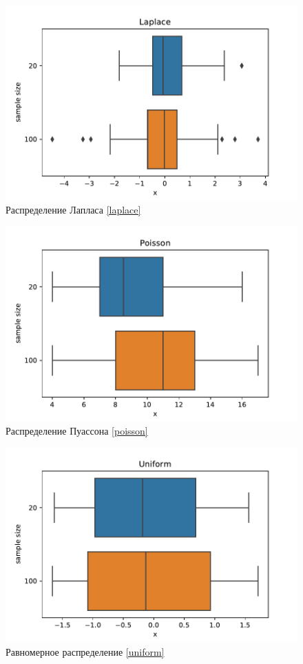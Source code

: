 \documentclass[a4paper]{article}
\begin{document}
\begin{figure}[H]
    \centering
    \includegraphics[width = 16 cm]{resources/LaplaceBox.pdf}
    \caption{Распределение Лапласа \eqref{laplace}}
    \label{fig:laplaceBox}
\end{figure}
\begin{figure}[H]
    \centering
    \includegraphics[width = 16 cm]{resources/PoissonBox.pdf}
    \caption{Распределение Пуассона \eqref{poisson}}
    \label{fig:poissonBox}
\end{figure}
\begin{figure}[H]
    \centering
    \includegraphics[width = 16 cm]{resources/UniformBox.pdf}
    \caption{Равномерное распределение \eqref{uniform}}
    \label{fig:uniformBox}
\end{figure}
\end{document}

